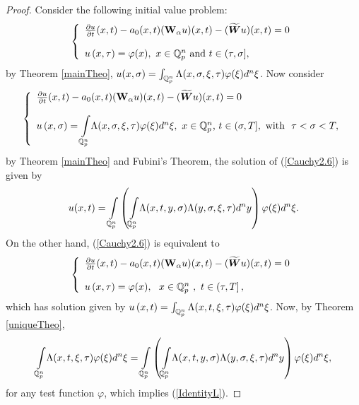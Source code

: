 \documentclass{amsart}\usepackage{amsfonts}
\theoremstyle{plain}
\numberwithin{equation}{section}
\begin{document}
\begin{proof}
Consider the following initial value problem:\begin{equation}
\left\{
\begin{array}
[c]{l}\frac{\partial u}{\partial t}(x,t)-a_{0}(x,t)(\boldsymbol{\mathbf{W}}_{\alpha
}u)(x,t)-(\widetilde{\boldsymbol{W}}u)(x,t)=0\\
\\
u\left(  x,\tau\right)  =\varphi(x),\text{\ }x\in\mathbb{Q}_{p}^{n}\text{ and
}t\in(\tau,\sigma],
\end{array}
\right.  \label{Cauchy2.5}\end{equation}
by Theorem \ref{mainTheo}, $u(x,\sigma)=\int_{\mathbb{Q}_{p}^{n}}{\LARGE \Lambda}(x,\sigma,\xi,\tau)\varphi(\xi)d^{n}\xi$. Now consider\begin{equation}
\left\{
\begin{array}
[c]{l}\frac{\partial u}{\partial t}(x,t)-a_{0}(x,t)(\boldsymbol{\mathbf{W}}_{\alpha
}u)(x,t)-(\widetilde{\boldsymbol{W}}u)(x,t)=0\\
\\
u\left(  x,\sigma\right)  ={\displaystyle\int\limits_{\mathbb{Q}_{p}^{n}}}
{\LARGE \Lambda}(x,\sigma,\xi,\tau)\varphi(\xi)d^{n}\xi,\text{\ }x\in\mathbb{Q}_{p}^{n}\text{, }t\in(\sigma,T],\text{ with \ }\tau<\sigma<T,
\end{array}
\right.  \label{Cauchy2.6}\end{equation}
by Theorem \ref{mainTheo} and Fubini's Theorem, the solution of
(\ref{Cauchy2.6}) is given by\[
u(x,t)={\displaystyle\int\limits_{\mathbb{Q}_{p}^{n}}}
\left(
{\displaystyle\int\limits_{\mathbb{Q}_{p}^{n}}}
{\LARGE \Lambda}(x,t,y,\sigma){\LARGE \Lambda}(y,\sigma,\xi,\tau
)d^{n}y\right)  \varphi(\xi)d^{n}\xi.
\]
On the other hand, (\ref{Cauchy2.6}) is equivalent to\begin{equation}
\left\{
\begin{array}
[c]{l}\frac{\partial u}{\partial t}(x,t)-a_{0}(x,t)(\boldsymbol{\mathbf{W}}_{\alpha
}u)(x,t)-(\widetilde{\boldsymbol{W}}u)(x,t)=0\\
\\
u\left(  x,\tau\right)  =\varphi(x),\text{ \ }x\in\mathbb{Q}_{p}^{n}\text{
},\text{ }t\in\left(  \tau,T\right]  ,
\end{array}
\right.  \label{Cauchy2.7}\end{equation}
which has solution given by $u\left(  x,t\right)  =\int_{\mathbb{Q}_{p}^{n}}{\LARGE \Lambda}(x,t,\xi,\tau)\varphi(\xi)d^{n}\xi$. Now, by Theorem
\ref{uniqueTheo},\[{\displaystyle\int\limits_{\mathbb{Q}_{p}^{n}}}
{\LARGE \Lambda}(x,t,\xi,\tau)\varphi(\xi)d^{n}\xi={\displaystyle\int\limits_{\mathbb{Q}_{p}^{n}}}
\left(
{\displaystyle\int\limits_{\mathbb{Q}_{p}^{n}}}
{\LARGE \Lambda}(x,t,y,\sigma){\LARGE \Lambda}(y,\sigma,\xi,\tau
)d^{n}y\right)  \varphi(\xi)d^{n}\xi,
\]
for any test function $\varphi$, which implies (\ref{IdentityL}).
\end{proof}
\end{document}
